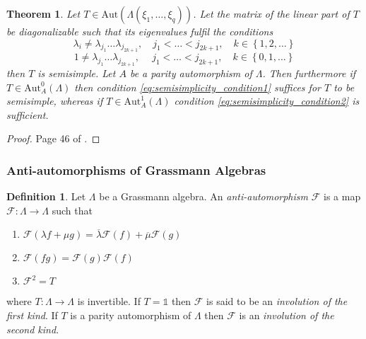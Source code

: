 \documentclass{article}
\newtheorem{theorem}{Theorem}
\theoremstyle{definition}
\newtheorem{definition}{Definition}
\begin{document}
\begin{theorem}
    Let $T \in \text{Aut}(\Lambda(\xi_1, \dots, \xi_q))$. Let the matrix of the linear part of $T$ be diagonalizable such that its eigenvalues fulfil the conditions
    \begin{equation}
        \label{eq:semisimplicity_condition1}
        \lambda_i \neq \lambda_{j_1} \dots \lambda_{j_{2k + 1}}, \quad j_1 < \dots < j_{2k + 1}, \quad k \in \left\{ 1, 2, \dots \right\}
    \end{equation}
    \begin{equation}
        \label{eq:semisimplicity_condition2}
        1 \neq \lambda_{j_1} \dots \lambda_{j_{2k + 1}}, \ \quad j_1 < \dots < j_{2k + 1}, \quad k \in \left\{ 0, 1, \dots \right\}
    \end{equation}
    then $T$ is semisimple. Let $A$ be a parity automorphism of $\Lambda$. Then furthermore if $T \in \text{Aut}_A^0(\Lambda)$ then condition \eqref{eq:semisimplicity_condition1} suffices for $T$ to be semisimple, whereas if $T \in \text{Aut}_A^1(\Lambda)$ condition \eqref{eq:semisimplicity_condition2} is sufficient.
\end{theorem}
\begin{proof}
    Page 46 of \cite{berezin_introduction_1987}.
\end{proof}


\subsubsection{Anti-automorphisms of Grassmann Algebras}

\begin{definition}
    \label{def:anti-automorphism}
    Let $\Lambda$ be a Grassmann algebra. An \emph{anti-automorphism} $\mathcal{F}$ is a map $\mathcal{F}: \Lambda \rightarrow \Lambda$ such that
    \begin{enumerate}
        \item $\mathcal{F}(\lambda f + \mu g) = \overline{\lambda} \mathcal{F}(f) + \overline{\mu} \mathcal{F} (g)$
        \item $\mathcal{F} (fg) = \mathcal{F}(g) \mathcal{F}(f)$
        \item $\mathcal{F}^2 = T$
    \end{enumerate}
    where $T: \Lambda \rightarrow \Lambda$ is invertible. If $T = \mathds{1}$ then $\mathcal{F}$ is said to be an \emph{involution of the first kind}. If $T$ is a parity automorphism of $\Lambda$ then $\mathcal{F}$ is an \emph{involution of the second kind}.
\end{definition}
\end{document}

